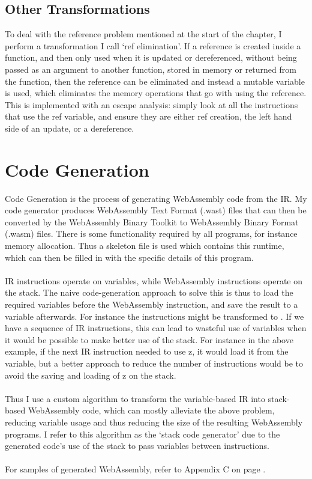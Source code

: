 \subsection{Other Transformations}
To deal with the reference problem mentioned at the start of the chapter, I perform a transformation I call `ref elimination'. If a reference is created inside a function, and then only used when it is updated or dereferenced, without being passed as an argument to another function, stored in memory or returned from the function, then the reference can be eliminated and instead a mutable variable is used, which eliminates the memory operations that go with using the reference. This is implemented with an escape analysis: simply look at all the instructions that use the ref variable, and ensure they are either ref creation, the left hand side of an update, or a dereference.


\section{Code Generation}

Code Generation is the process of generating WebAssembly code from the IR. My code generator produces WebAssembly Text Format (.wast) files that can then be converted by the WebAssembly Binary Toolkit to WebAssembly Binary Format (.wasm) files. There is some functionality required by all programs, for instance memory allocation. Thus a skeleton file is used which contains this runtime, which can then be filled in with the specific details of this program.
\\\\
IR instructions operate on variables, while WebAssembly instructions operate on the stack. The naive code-generation approach to solve this is thus to load the required variables before the WebAssembly instruction, and save the result to a variable afterwards. For instance the instructions  might be transformed to . If we have a sequence of IR instructions, this can lead to wasteful use of variables when it would be possible to make better use of the stack. For instance in the above example, if the next IR instruction needed to use z, it would load it from the variable, but a better approach to reduce the number of instructions would be to avoid the saving and loading of z on the stack.
\\\\
Thus I use a custom algorithm to transform the variable-based IR into stack-based WebAssembly code, which can mostly alleviate the above problem, reducing variable usage and thus reducing the size of the resulting WebAssembly programs. I refer to this algorithm as the `stack code generator' due to the generated code's use of the stack to pass variables between instructions.
\\\\
For samples of generated WebAssembly, refer to Appendix C on page \pageref{chapter:gcd}.


